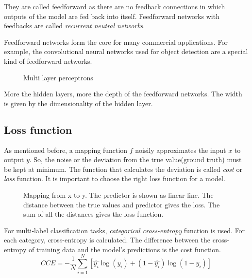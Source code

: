 They are called feedforward as there are no feedback connections in which outputs of the
model are fed back into itself. Feedforward networks with feedbacks are called
\textit{recurrent neutral networks}.

Feedforward networks form the core for many commercial applications. For example, the
convolutional neural networks used for object detection are a special kind of feedforward
networks.
\begin{figure}[h]
    \def\svgwidth{0.8\textwidth}
	\begin{center}
    \end{center}
    \caption{Multi layer perceptrons}
    \label{fig:MLP}
\end{figure}

More the hidden layers, more the depth of the feedforward networks. The width is given by
the dimensionality of the hidden layer.

\subsection{Loss function}
\label{subsec:lossfunction}
As mentioned before, a mapping function $f$ noisily approximates the input $x$ to output
$y$. So, the noise or the deviation from the true value(ground truth) must be kept at
minimum. The function that calculates the deviation is called \textit{cost} or
\textit{loss} function. It is important to choose the right loss function for a model.

\begin{figure}[!h]
	\centering
    \def\svgwidth{0.8\textwidth}
    \caption{Mapping from x to y. The predictor is shown as linear line. The distance
    between the true values and predictor gives the loss. The sum of all the distances
gives the loss function.}
\label{fig:loss function}
\end{figure}

For multi-label classification tasks, \textit{categorical cross-entropy} function is used.
For each category, cross-entropy is calculated. The difference between the cross-entropy
of training data and the model's predictions is the cost function.
\begin{equation}
  CCE = -\frac{1}{N}\sum_{i = 1}^N [\hat{y_{i}}\log(y_{i})  + (1-
  \hat{y_{i}})\log(1-y_{i})]
   \label{eq:CCE}
\end{equation}

